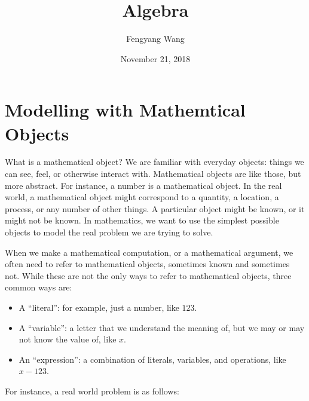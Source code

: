 \documentclass[a4paper,10pt]{report}
\title{Algebra}
\author{Fengyang Wang}
\date{November 21, 2018}
\begin{document}
\maketitle

\tableofcontents

\chapter{Modelling with Mathemtical Objects}

What is a mathematical object? We are familiar with everyday objects: things we can see,
feel, or otherwise interact with. Mathematical objects are like those, but more abstract.
For instance, a number is a mathematical object. In the real world, a mathematical object
might correspond to a quantity, a location, a process, or any number of other things. A
particular object might be known, or it might not be known. In mathematics, we want to use
the simplest possible objects to model the real problem we are trying to solve.

When we make a mathematical computation, or a mathematical argument, we often need to refer
to mathematical objects, sometimes known and sometimes not. While these are not the only
ways to refer to mathematical objects, three common ways are:

\begin{itemize}
  \item A ``literal'': for example, just a number, like \(123\).
  \item A ``variable'': a letter that we understand the meaning of, but we may or may not
  know the value of, like \(x\).
  \item An ``expression'': a combination of literals, variables, and operations, like \(x -
  123\).
\end{itemize}

For instance, a real world problem is as follows:
\end{document}
